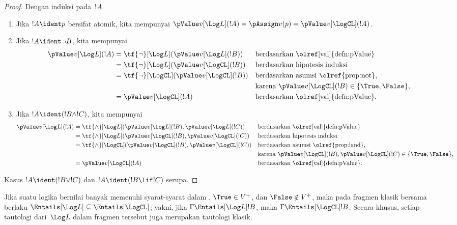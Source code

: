 \documentclass[../../../include/open-logic-section]{subfiles}
\begin{document}
\begin{proof}
  Dengan induksi pada~$!A$.
  \begin{enumerate}
  \item Jika $!A\ident p$ bersifat atomik, kita mempunyai
  $\pValue v[\Log L](!A)=\pAssign v(p)=\pValue v[\LogCL](!A)$.
  \item Jika $!A\ident\lnot B$, kita mempunyai
  \begin{align*}
    \pValue v[\Log L](!A) & = \tf{\lnot}[\Log L](\pValue v[\Log L](!B)) & &\text{berdasarkan \olref[val]{defn:pValue}}\\
    & = \tf{\lnot}[\Log L](\pValue v[\LogCL](!B)) && \text{berdasarkan hipotesis induksi}\\
    & = \tf{\lnot}[\LogCL](\pValue v[\LogCL](!B))
&&\text{berdasarkan asumsi \olref{prop:not},}\\
&&&\text{karena $\pValue v[\LogCL](!B)\in\{\True,\False\}$,}\\
& = \pValue v[\LogCL](!A) &&\text{berdasarkan \olref[val]{defn:pValue}}.
\end{align*}
\item Jika $!A\ident(!B\land !C)$, kita mempunyai
\begin{align*}
  \pValue v[\Log L](!A) & = \tf{\land}[\Log L](\pValue v[\Log L](!B), \pValue v[\Log L](!C)) & &\text{berdasarkan \olref[val]{defn:pValue}}\\
  & = \tf{\land}[\Log L](\pValue v[\LogCL](!B),\pValue v[\LogCL](!C)) && \text{berdasarkan hipotesis induksi}\\
  & = \tf{\land}[\LogCL](\pValue v[\LogCL](!B),\pValue v[\LogCL](!C))
&&\text{berdasarkan asumsi \olref{prop:land},}\\
&&&\text{karena $\pValue v[\LogCL](!B),\pValue v[\LogCL](!C)\in\{\True,\False\}$,}\\
& = \pValue v[\LogCL](!A) &&\text{berdasarkan \olref[val]{defn:pValue}}.
\end{align*}
\end{enumerate}
Kasus $!A\ident(!B\lor !C)$ dan $!A\ident(!B\lif !C)$ serupa.
\end{proof}

\begin{cor}
  Jika suatu logika bernilai banyak memenuhi syarat-syarat dalam
  , $\True\in V^+$, dan $\False\notin V^+$, maka pada
  fragmen klasik bersama berlaku
  ${\Entails[\Log L]}\subseteq{\Entails[\LogCL]}$; yakni, jika
  $\Gamma\Entails[\Log L]!B$, maka $\Gamma\Entails[\LogCL]!B$. Secara
  khusus, setiap tautologi dari~$\Log L$ dalam fragmen tersebut juga
  merupakan tautologi klasik.
\end{cor}
\end{document}
